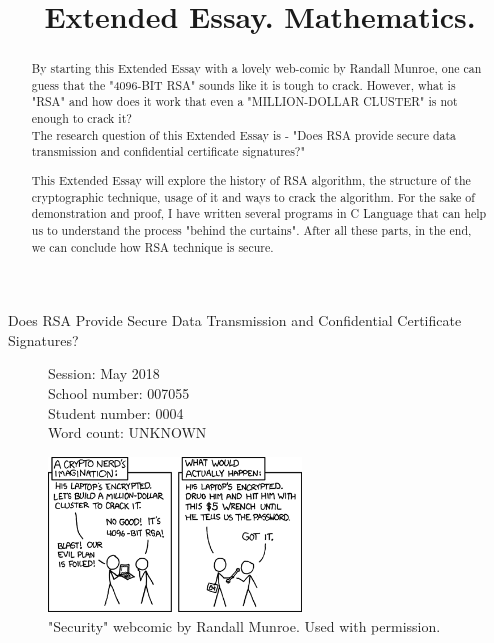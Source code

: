 \documentclass[a4paper, 12pt]{article}
\title{Extended Essay. Mathematics.}
\date{}
\begin{document}

\maketitle

\begin{center}
Does RSA Provide Secure Data Transmission and Confidential Certificate Signatures?
\end{center}

\begin{flushleft}
\begin{figure}[b]
  Session: May 2018\\
  School number: 007055\\
  Student number: 0004\\
  Word count: UNKNOWN\\
\end{figure}
\end{flushleft}

\newpage


\tableofcontents
\newpage
\listoffigures
\listoftables
\lstlistoflistings


\newpage
{}

\begin{figure}[h!]
  \begin{center}
    \includegraphics[width=0.6\textwidth]{xkcd_security.png}
    \caption{"Security" webcomic by Randall Munroe. Used with permission.\cite{xkcd}}
    \label{fig:xkcd}
    \end{center}
  \end{figure}

\begin{abstract}
\label{sec:abstract}

By starting this Extended Essay with a lovely web-comic by Randall Munroe, one can guess that the "4096-BIT RSA" sounds like it is tough to crack.
However, what is "RSA" and how does it work that even a "MILLION-DOLLAR CLUSTER" is not enough to crack it?\\
The research question of this Extended Essay is - "Does RSA provide secure data transmission
and confidential certificate signatures?"

This Extended Essay will explore the history of RSA
algorithm, the structure of the cryptographic technique, usage of it and ways to crack the algorithm.
For the sake of demonstration and proof, I have written several programs in C Language\cite{Clang} that can help us to understand the process "behind the curtains". After all these parts, in the end, we can conclude how RSA technique is secure.
\end{abstract}
\end{document}
